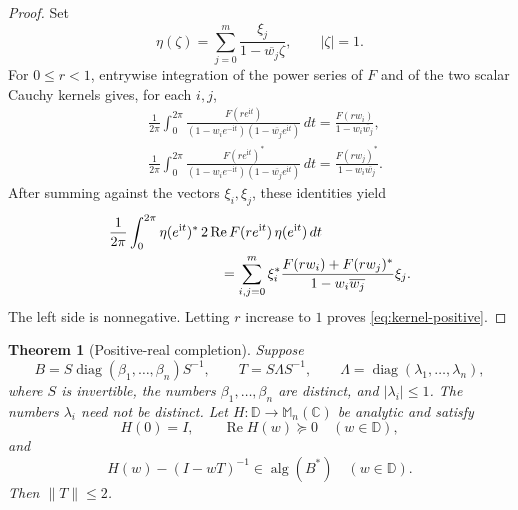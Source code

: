 \documentclass[preprints,article,submit,oneauthor]{Definitions/mdpi}
\newcounter{manuscriptresult}[section]
\theoremstyle{mdpi}
\newtheorem{theorem}[manuscriptresult]{Theorem}
\theoremstyle{definition}
\newcommand{\C}{\mathbb C}
\newcommand{\D}{\mathbb D}
\newcommand{\Mn}{\mathbb M_n(\C)}
\newcommand{\alg}{\operatorname{alg}}
\newcommand{\RePart}{\operatorname{Re}}
\newcommand{\diag}{\operatorname{diag}}
\newcommand{\iu}{\mathrm{i}}
\begin{document}
\begin{proof}
Set
\[
  \eta(\zeta)=\sum_{j=0}^m
  \frac{\xi_j}{1-\overline{w_j}\zeta},
  \qquad \lvert\zeta\rvert=1.
\]
For $0\leq r<1$, entrywise integration of the power series of $F$
and of the two scalar Cauchy kernels gives, for each $i,j$,
\begin{align*}
  &\frac1{2\pi}\int_0^{2\pi}
  \frac{F(re^{\iu t})}
  {(1-w_i e^{-\iu t})(1-\overline{w_j}e^{\iu t})}\,dt
  =\frac{F(rw_i)}{1-w_i\overline{w_j}},\\
  &\frac1{2\pi}\int_0^{2\pi}
  \frac{F(re^{\iu t})^*}
  {(1-w_i e^{-\iu t})(1-\overline{w_j}e^{\iu t})}\,dt
  =\frac{F(rw_j)^*}{1-w_i\overline{w_j}}.
\end{align*}
After summing against the vectors $\xi_i,\xi_j$, these identities yield
\begin{align}
  &\frac1{2\pi}\int_0^{2\pi}
  \eta(e^{\iu t})^*\,2\RePart F(re^{\iu t})\,
  \eta(e^{\iu t})\,dt \notag\\
  &\hspace{28mm}=
  \sum_{i,j=0}^m\xi_i^*
  \frac{F(rw_i)+F(rw_j)^*}{1-w_i\overline{w_j}}\xi_j.
  \label{eq:Herglotz-integral}
\end{align}
The left side is nonnegative.  Letting $r$ increase to $1$ proves
\eqref{eq:kernel-positive}.
\end{proof}

\begin{theorem}[Positive-real completion]
\label{thm:completion}
Suppose
\begin{equation}
  B=S\diag(\beta_1,\ldots,\beta_n)S^{-1},
  \qquad
  T=S\Lambda S^{-1},
  \qquad
  \Lambda=\diag(\lambda_1,\ldots,\lambda_n),
  \label{eq:simultaneous-diagonalization}
\end{equation}
where $S$ is invertible, the numbers $\beta_1,\ldots,\beta_n$ are
distinct, and $\lvert\lambda_i\rvert\leq1$.  The numbers $\lambda_i$
need not be distinct.  Let $H\colon\D\to\Mn$ be analytic and satisfy
\begin{equation}
  H(0)=I,
  \qquad
  \RePart H(w)\succeq0\quad(w\in\D),
  \label{eq:completion-positive}
\end{equation}
and
\begin{equation}
  H(w)-(I-wT)^{-1}\in\alg(B^*)
  \quad(w\in\D).
  \label{eq:completion-algebra}
\end{equation}
Then $\lVert T\rVert\leq2$.
\end{theorem}
\end{document}
